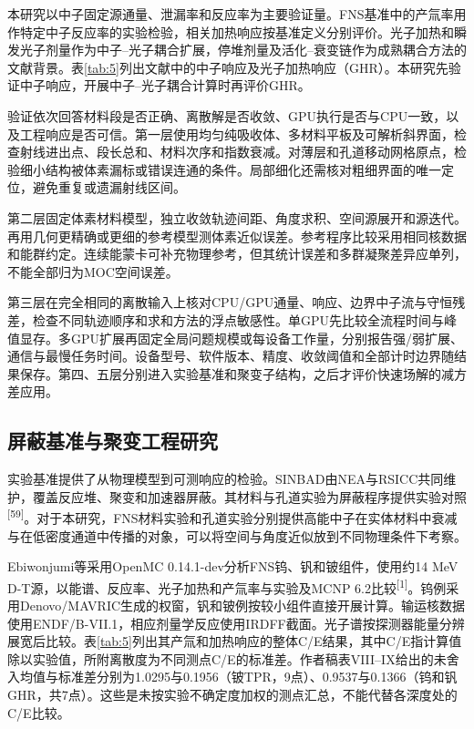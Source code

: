 \documentclass[UTF8, zihao=-4, fontset=none, a4paper]{ctexart}
\newcommand{\upcite}[1]{\textsuperscript{[#1]}}
\begin{document}
本研究以中子固定源通量、泄漏率和反应率为主要验证量。FNS基准中的产氚率用作特定中子反应率的实验检验，相关加热响应按基准定义分别评价。光子加热和瞬发光子剂量作为中子--光子耦合扩展，停堆剂量及活化--衰变链作为成熟耦合方法的文献背景。表\ref{tab:5}列出文献中的中子响应及光子加热响应（GHR）。本研究先验证中子响应，开展中子--光子耦合计算时再评价GHR。

验证依次回答材料段是否正确、离散解是否收敛、GPU执行是否与CPU一致，以及工程响应是否可信。第一层使用均匀纯吸收体、多材料平板及可解析斜界面，检查射线进出点、段长总和、材料次序和指数衰减。对薄层和孔道移动网格原点，检验细小结构被体素漏标或错误连通的条件。局部细化还需核对粗细界面的唯一定位，避免重复或遗漏射线区间。

第二层固定体素材料模型，独立收敛轨迹间距、角度求积、空间源展开和源迭代。再用几何更精确或更细的参考模型测体素近似误差。参考程序比较采用相同核数据和能群约定。连续能蒙卡可补充物理参考，但其统计误差和多群凝聚差异应单列，不能全部归为MOC空间误差。

第三层在完全相同的离散输入上核对CPU/GPU通量、响应、边界中子流与守恒残差，检查不同轨迹顺序和求和方法的浮点敏感性。单GPU先比较全流程时间与峰值显存。多GPU扩展再固定全局问题规模或每设备工作量，分别报告强/弱扩展、通信与最慢任务时间。设备型号、软件版本、精度、收敛阈值和全部计时边界随结果保存。第四、五层分别进入实验基准和聚变子结构，之后才评价快速场解的减方差应用。

\subsection{屏蔽基准与聚变工程研究}

实验基准提供了从物理模型到可测响应的检验。SINBAD由NEA与RSICC共同维护，覆盖反应堆、聚变和加速器屏蔽。其材料与孔道实验为屏蔽程序提供实验对照\upcite{59}。对于本研究，FNS材料实验和孔道实验分别提供高能中子在实体材料中衰减与在低密度通道中传播的对象，可以将空间与角度近似放到不同物理条件下考察。

Ebiwonjumi等采用OpenMC 0.14.1-dev分析FNS钨、钒和铍组件，使用约14 MeV D-T源，以能谱、反应率、光子加热和产氚率与实验及MCNP 6.2比较\upcite{1}。钨例采用Denovo/MAVRIC生成的权窗，钒和铍例按较小组件直接开展计算。输运核数据使用ENDF/B-VII.1，相应剂量学反应使用IRDFF截面。光子谱按探测器能量分辨展宽后比较。表\ref{tab:5}列出其产氚和加热响应的整体C/E结果，其中C/E指计算值除以实验值，所附离散度为不同测点C/E的标准差。作者稿表VIII--IX给出的未舍入均值与标准差分别为1.0295与0.1956（铍TPR，9点）、0.9537与0.1366（钨和钒GHR，共7点）。这些是未按实验不确定度加权的测点汇总，不能代替各深度处的C/E比较。
\end{document}
